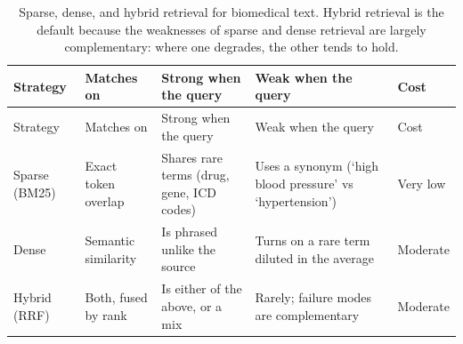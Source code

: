 \documentclass[
  letterpaper,
  11pt]{scrbook}
\begin{document}
\begin{longtable}[]{@{}
  >{\raggedright\arraybackslash}p{}
  >{\raggedright\arraybackslash}p{}
  >{\raggedright\arraybackslash}p{}
  >{\raggedright\arraybackslash}p{}
  >{\raggedright\arraybackslash}p{}@{}}
\caption{Sparse, dense, and hybrid retrieval for biomedical text. Hybrid
retrieval is the default because the weaknesses of sparse and dense
retrieval are largely complementary: where one degrades, the other tends
to hold.}\label{tbl-retrieval-comparison}\tabularnewline
\toprule\noalign{}
\begin{minipage}[b]{\linewidth}\raggedright
Strategy
\end{minipage} & \begin{minipage}[b]{\linewidth}\raggedright
Matches on
\end{minipage} & \begin{minipage}[b]{\linewidth}\raggedright
Strong when the query
\end{minipage} & \begin{minipage}[b]{\linewidth}\raggedright
Weak when the query
\end{minipage} & \begin{minipage}[b]{\linewidth}\raggedright
Cost
\end{minipage} \\
\midrule\noalign{}
\endfirsthead
\toprule\noalign{}
\begin{minipage}[b]{\linewidth}\raggedright
Strategy
\end{minipage} & \begin{minipage}[b]{\linewidth}\raggedright
Matches on
\end{minipage} & \begin{minipage}[b]{\linewidth}\raggedright
Strong when the query
\end{minipage} & \begin{minipage}[b]{\linewidth}\raggedright
Weak when the query
\end{minipage} & \begin{minipage}[b]{\linewidth}\raggedright
Cost
\end{minipage} \\
\midrule\noalign{}
\endhead
\bottomrule\noalign{}
\endlastfoot
Sparse (BM25) & Exact token overlap & Shares rare terms (drug, gene, ICD
codes) & Uses a synonym (`high blood pressure' vs `hypertension') & Very
low \\
Dense & Semantic similarity & Is phrased unlike the source & Turns on a
rare term diluted in the average & Moderate \\
Hybrid (RRF) & Both, fused by rank & Is either of the above, or a mix &
Rarely; failure modes are complementary & Moderate \\
\end{longtable}
\end{document}
